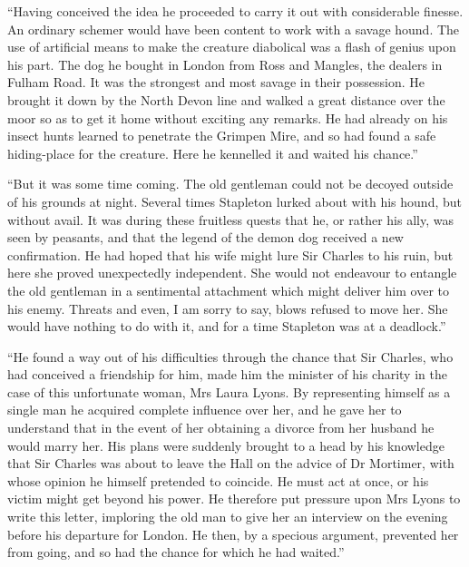 \documentclass[paper=5.5in:8.5in,BCOR=7mm,twoside,DIV=calc,12pt,usegeometry,openany,chapterprefix,endperiod]{scrbook} %
\begin{document}
\enquote{Having conceived the idea he proceeded to carry it out with considerable finesse. An ordinary schemer would have been content to work with a savage hound. The use of artificial means to make the creature diabolical was a flash of genius upon his part. The dog he bought in London from Ross and Mangles, the dealers in Fulham Road. It was the strongest and most savage in their possession. He brought it down by the North Devon line and walked a great distance over the moor so as to get it home without exciting any remarks. He had already on his insect hunts learned to penetrate the Grimpen Mire, and so had found a safe hiding-place for the creature. Here he kennelled it and waited his chance.}

\enquote{But it was some time coming. The old gentleman could not be decoyed outside of his grounds at night. Several times Stapleton lurked about with his hound, but without avail. It was during these fruitless quests that he, or rather his ally, was seen by peasants, and that the legend of the demon dog received a new confirmation. He had hoped that his wife might lure Sir Charles to his ruin, but here she proved unexpectedly independent. She would not endeavour to entangle the old gentleman in a sentimental attachment which might deliver him over to his enemy. Threats and even, I am sorry to say, blows refused to move her. She would have nothing to do with it, and for a time Stapleton was at a deadlock.}

\enquote{He found a way out of his difficulties through the chance that Sir Charles, who had conceived a friendship for him, made him the minister of his charity in the case of this unfortunate woman, Mrs Laura Lyons. By representing himself as a single man he acquired complete influence over her, and he gave her to understand that in the event of her obtaining a divorce from her husband he would marry her. His plans were suddenly brought to a head by his knowledge that Sir Charles was about to leave the Hall on the advice of Dr Mortimer, with whose opinion he himself pretended to coincide. He must act at once, or his victim might get beyond his power. He therefore put pressure upon Mrs Lyons to write this letter, imploring the old man to give her an interview on the evening before his departure for London. He then, by a specious argument, prevented her from going, and so had the chance for which he had waited.}
\end{document}
